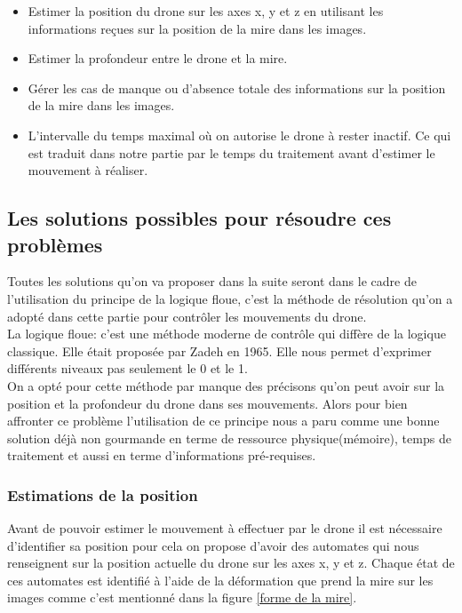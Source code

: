\documentclass[12pt]{article}
\begin{document}
\begin{itemize}
\item Estimer la position du drone sur les axes x, y et z en utilisant les informations reçues sur la position de la mire dans les images.
\item Estimer la profondeur entre le drone et la mire.
\item Gérer les cas de manque ou d'absence totale des informations sur la position de la mire dans les images. 
\item L'intervalle du temps maximal où on autorise le drone à rester inactif. Ce qui est traduit dans notre partie par le temps du traitement avant d'estimer le mouvement à réaliser. 
\end{itemize}


\subsection{Les solutions possibles pour résoudre ces problèmes }
Toutes les solutions qu'on va proposer dans la suite seront dans le cadre de l'utilisation du principe de la logique floue, c'est la méthode de résolution qu'on a adopté dans cette partie pour contrôler les mouvements du drone. \\
La logique floue\cite{LaLogiqueFloue}: c'est une méthode moderne de contrôle qui diffère de la logique classique. Elle était proposée par Zadeh en 1965. Elle nous permet d'exprimer différents niveaux pas seulement le 0 et le 1.\\
On a opté pour cette méthode par manque des précisons qu'on peut avoir sur la position et la profondeur du drone dans ses mouvements. Alors pour bien affronter ce problème l'utilisation de ce principe nous a paru comme une bonne solution déjà non gourmande en terme de ressource physique(mémoire), temps de traitement et aussi en terme d'informations pré-requises.

\subsubsection{Estimations de la position}
Avant de pouvoir estimer le mouvement à effectuer par le drone il est nécessaire d'identifier sa position pour cela on propose d'avoir des automates qui nous renseignent sur la position actuelle du drone sur les axes x, y et z.
Chaque état de ces automates est identifié à l'aide de la déformation que prend la mire sur les images comme c'est mentionné dans la figure \ref{forme de la mire}. \\
\end{document}
